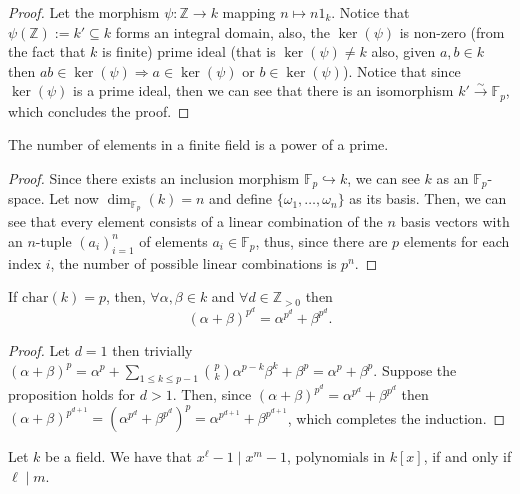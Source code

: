 \begin{proof}
    Let the morphism \(\psi: \mathbb{Z} \to k\) mapping \(n \mapsto n 1_k\).
    Notice that \(\psi(\mathbb{Z}) := k' \subseteq k\) forms an integral domain,
    also, the \(\ker(\psi)\) is non-zero (from the fact that \(k\) is finite)
    prime ideal (that is \(\ker(\psi) \neq k\) also, given \(a, b \in k\) then
    \(ab \in \ker(\psi) \Rightarrow a \in \ker(\psi)\) or \(b \in \ker(\psi)\)).
    Notice that since \(\ker(\psi)\) is a prime ideal, then we can see that there
    is an isomorphism \(k' \xrightarrow{\sim} \mathbb{F}_p\), which concludes the
    proof.
\end{proof}

\begin{proposition}
    The number of elements in a finite field is a power of a prime.
\end{proposition}

\begin{proof}
    Since there exists an inclusion morphism \(\mathbb{F}_p \hookrightarrow k\),
    we can see \(k\) as an \(\mathbb{F}_p\)-space. Let now
    \(\dim_{\mathbb{F}_p}(k) = n\) and define \(\{\omega_1, \dots, \omega_n\}\)
    as its basis. Then, we can see that every element consists of a linear
    combination of the \(n\) basis vectors with an \(n\)-tuple \((a_i)_{i=1}^n\)
    of elements \(a_i \in \mathbb{F}_p\), thus, since there are \(p\) elements
    for each index \(i\), the number of possible linear combinations is \(p^n\).
\end{proof}

\begin{proposition}
    If \(\mathrm{char}(k) = p\), then, \(\forall \alpha, \beta \in k\) and \(\forall d
    \in \mathbb{Z}_{>0}\) then
    \[
        (\alpha + \beta)^{p^d} = \alpha^{p^d} + \beta^{p^d}.
    \]
\end{proposition}

\begin{proof}
    Let \(d = 1\) then trivially  \((\alpha + \beta)^p = \alpha^p + \sum_{1
        \leqslant k \leqslant p-1} \binom{p}{k} \alpha^{p-k}\beta^k + \beta^p =
    \alpha^p + \beta^p\). Suppose the proposition holds for \(d > 1\). Then,
    since \((\alpha + \beta)^{p^d} = \alpha^{p^d} + \beta^{p^d}\) then
    \((\alpha + \beta)^{p^{d+1}} = (\alpha^{p^d} + \beta^{p^d})^p
    = \alpha^{p^{d+1}} + \beta^{p^{d+1}}\), which completes the induction.
\end{proof}

\begin{proposition}
    Let \(k\) be a field. We have that \(x^\ell - 1 \mid x^m - 1\), polynomials in
    \(k[x]\), if and only if \(\ell \mid m\).
\end{proposition}

